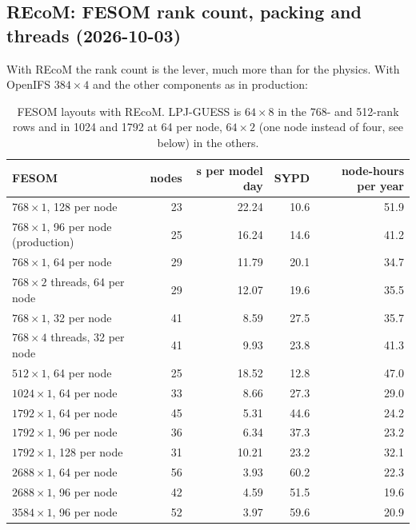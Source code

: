 \documentclass[11pt,a4paper]{article}
\begin{document}
\subsection{REcoM: FESOM rank count, packing and threads (2026-10-03)}
With REcoM the rank count is the lever, much more than for the physics. With OpenIFS $384\times4$ and the other components as in production:
\begin{table}[H]\centering\footnotesize
\begin{tabular}{lrrrr}\toprule
FESOM & nodes & s per model day & SYPD & node-hours per year\\\midrule
$768\times1$, 128 per node & 23 & 22.24 & 10.6 & 51.9\\
$768\times1$, 96 per node (production) & 25 & 16.24 & 14.6 & 41.2\\
$768\times1$, 64 per node & 29 & 11.79 & 20.1 & 34.7\\
$768\times2$ threads, 64 per node & 29 & 12.07 & 19.6 & 35.5\\
$768\times1$, 32 per node & 41 & 8.59 & 27.5 & 35.7\\
$768\times4$ threads, 32 per node & 41 & 9.93 & 23.8 & 41.3\\
$512\times1$, 64 per node & 25 & 18.52 & 12.8 & 47.0\\
$1024\times1$, 64 per node & 33 & 8.66 & 27.3 & 29.0\\
$1792\times1$, 64 per node & 45 & 5.31 & 44.6 & 24.2\\
$1792\times1$, 96 per node & 36 & 6.34 & 37.3 & 23.2\\
$1792\times1$, 128 per node & 31 & 10.21 & 23.2 & 32.1\\
$2688\times1$, 64 per node & 56 & 3.93 & 60.2 & 22.3\\
$2688\times1$, 96 per node & 42 & 4.59 & 51.5 & 19.6\\
$3584\times1$, 96 per node & 52 & 3.97 & 59.6 & 20.9\\\bottomrule
\end{tabular}
\caption{FESOM layouts with REcoM. LPJ-GUESS is $64\times8$ in the 768- and 512-rank rows and in 1024 and 1792 at 64 per node, $64\times2$ (one node instead of four, see below) in the others.}\label{tab:recom_fesom}
\end{table}
\end{document}

